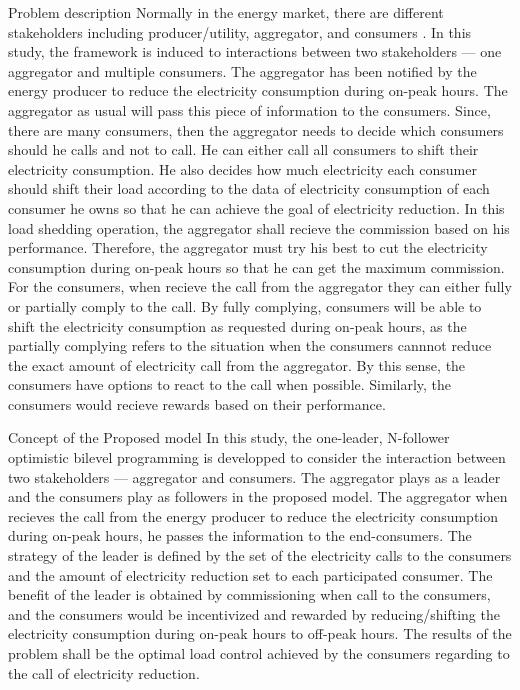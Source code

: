 \documentclass[a4paper]{article}
\begin{document}
{\red Problem description} Normally in the energy market, there are different stakeholders including producer/utility, aggregator, and consumers \cite{ALAMOUSH2024114074}.
In this study, the framework is induced to interactions between two stakeholders --- one aggregator and multiple consumers.
The aggregator has been notified by the energy producer to reduce the electricity consumption during on-peak hours.
The aggregator as usual will pass this piece of information to the consumers.
Since, there are many consumers, then the aggregator needs to decide which consumers should he calls and not to call.
He can either call all consumers to shift their electricity consumption.
He also decides how much electricity each consumer should shift their load according to the data of electricity consumption of each consumer he owns so that he can achieve the goal of electricity reduction.
In this load shedding operation, the aggregator shall recieve the commission based on his performance.
Therefore, the aggregator must try his best to cut the electricity consumption during on-peak hours so that he can get the maximum commission.
For the consumers, when recieve the call from the aggregator they can either fully or partially comply to the call.
By fully complying, consumers will be able to shift the electricity consumption as requested during on-peak hours, as the partially complying refers to the situation when the consumers cannnot reduce the exact amount of electricity call from the aggregator.
By this sense, the consumers have options to react to the call when possible.
Similarly, the consumers would recieve rewards based on their performance.

{\red Concept of the Proposed model}
In this study, the one-leader, N-follower optimistic bilevel programming is developped to consider the interaction between two stakeholders --- aggregator and consumers.
The aggregator plays as a leader and the consumers play as followers in the proposed model.
The aggregator when recieves the call from the energy producer to reduce the electricity consumption during on-peak hours, he passes the information to the end-consumers.
The strategy of the leader is defined by the set of the electricity calls to the consumers and the amount of electricity reduction set to each participated consumer.
The benefit of the leader is obtained by commissioning when call to the consumers, and the consumers would be incentivized and rewarded by reducing/shifting the electricity consumption during on-peak hours to off-peak hours.
The results of the problem shall be the optimal load control achieved by the consumers regarding to the call of electricity reduction.
\end{document}
